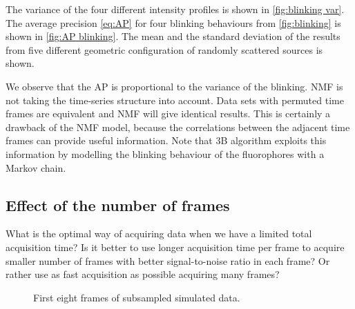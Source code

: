 The variance of the four different intensity profiles is shown in \autoref{fig:blinking var}. The average precision \autoref{eq:AP} for four blinking behaviours from \autoref{fig:blinking} is shown in \autoref{fig:AP blinking}. The mean and the standard deviation of the results from five different geometric configuration of randomly scattered sources is shown. 

We observe that the AP is proportional to the variance of the blinking. NMF is not taking the time-series structure into account. Data sets with permuted time frames are equivalent and NMF will give identical results. This is certainly a drawback of the NMF model, because the correlations between the adjacent time frames can provide useful information. Note that 3B algorithm  \cite{Cox2011} exploits this information by modelling the blinking behaviour of the fluorophores with a Markov chain.


\subsection{Effect of the number of frames\label{sub:results - number of frames}}
%

What is the optimal way of acquiring data when we have a limited total acquisition time? Is it better to use longer acquisition time per frame to acquire smaller number of frames with better signal-to-noise ratio in each frame? Or rather use as fast acquisition as possible acquiring many frames? 

\begin{figure}[!htb]	
	\newcommand{\widthfig}{1\textwidth}
	\centering	
	
	
	
	\caption{First eight frames of subsampled simulated data. }
	\label{fig:subsampled data}
\end{figure} 

